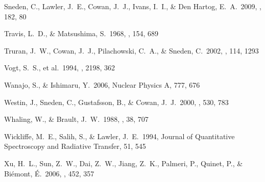 \documentclass{emulateapj}
\begin{document}
\begin{thebibliography}{}
 Sneden, C., Lawler, J.~E., 
Cowan, J.~J., Ivans, I.~I., \& Den Hartog, E.~A.\ 2009, \apjs, 182, 80 

 Travis, L.~D., \& 
Matsushima, S.\ 1968, \apj, 154, 689 

 Truran, J.~W., Cowan, 
J.~J., Pilachowski, C.~A., \& Sneden, C.\ 2002, \pasp, 114, 1293 

 Vogt, S.~S., et al.\ 1994, 
\procspie, 2198, 362 

 Wanajo, S., \& Ishimaru, Y.\ 
2006, Nuclear Physics A, 777, 676 

 Westin, J., Sneden, C., 
Gustafsson, B., \& Cowan, J.~J.\ 2000, \apj, 530, 783 

 Whaling, W., \& Brault, J.~W.\ 
1988, \physscr, 38, 707 

 Wickliffe, M.~E., 
Salih, S., \& Lawler, J.~E.\ 1994, Journal of Quantitative Spectroscopy 
and Radiative Transfer, 51, 545 

 Xu, H.~L., Sun, Z.~W., Dai, Z.~W., 
Jiang, Z.~K., Palmeri, P., Quinet, P., \& Bi{\'e}mont, {\'E}.\ 
2006, \aap, 452, 357 


\end{thebibliography}
\end{document}
